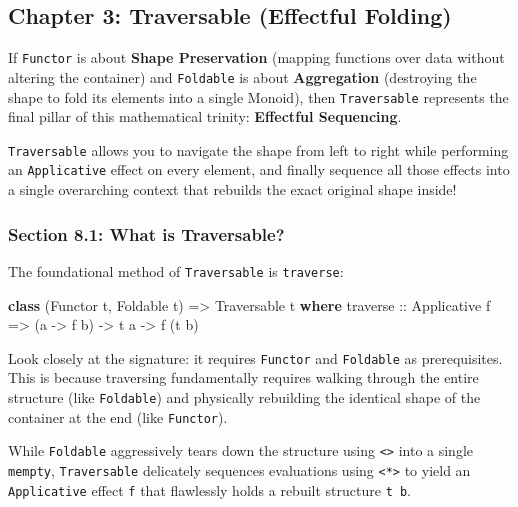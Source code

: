 \documentclass[
]{article}
\newenvironment{Shaded}{}{}
\newcommand{\DataTypeTok}[1]{\textcolor[rgb]{0.56,0.13,0.00}{#1}}
\newcommand{\KeywordTok}[1]{\textcolor[rgb]{0.00,0.44,0.13}{\textbf{#1}}}
\newcommand{\NormalTok}[1]{#1}
\newcommand{\OtherTok}[1]{\textcolor[rgb]{0.00,0.44,0.13}{#1}}
\begin{document}
\subsection{Chapter 3: Traversable (Effectful
Folding)}\label{chapter-3-traversable-effectful-folding}

If \texttt{Functor} is about \textbf{Shape Preservation} (mapping
functions over data without altering the container) and
\texttt{Foldable} is about \textbf{Aggregation} (destroying the shape to
fold its elements into a single Monoid), then \texttt{Traversable}
represents the final pillar of this mathematical trinity:
\textbf{Effectful Sequencing}.

\texttt{Traversable} allows you to navigate the shape from left to right
while performing an \texttt{Applicative} effect on every element, and
finally sequence all those effects into a single overarching context
that rebuilds the exact original shape inside!

\subsubsection{Section 8.1: What is
Traversable?}\label{section-8.1-what-is-traversable}

The foundational method of \texttt{Traversable} is \texttt{traverse}:

\begin{Shaded}
\begin{Highlighting}[]
\KeywordTok{class}\NormalTok{ (}\DataTypeTok{Functor}\NormalTok{ t, }\DataTypeTok{Foldable}\NormalTok{ t) }\OtherTok{=\textgreater{}} \DataTypeTok{Traversable}\NormalTok{ t }\KeywordTok{where}
\OtherTok{    traverse ::} \DataTypeTok{Applicative}\NormalTok{ f }\OtherTok{=\textgreater{}}\NormalTok{ (a }\OtherTok{{-}\textgreater{}}\NormalTok{ f b) }\OtherTok{{-}\textgreater{}}\NormalTok{ t a }\OtherTok{{-}\textgreater{}}\NormalTok{ f (t b)}
\end{Highlighting}
\end{Shaded}

Look closely at the signature: it requires \texttt{Functor} and
\texttt{Foldable} as prerequisites. This is because traversing
fundamentally requires walking through the entire structure (like
\texttt{Foldable}) and physically rebuilding the identical shape of the
container at the end (like \texttt{Functor}).

While \texttt{Foldable} aggressively tears down the structure using
\texttt{\textless{}\textgreater{}} into a single \texttt{mempty},
\texttt{Traversable} delicately sequences evaluations using
\texttt{\textless{}*\textgreater{}} to yield an \texttt{Applicative}
effect \texttt{f} that flawlessly holds a rebuilt structure
\texttt{t\ b}.
\end{document}
